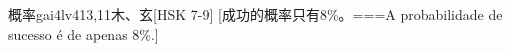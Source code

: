 \begin{EntryWithPhonetic}{概率}{gai4lv4}{13,11}{⽊、⽞}[HSK 7-9]
  [成功的概率只有8\%。===A probabilidade de sucesso é de apenas 8\%.]
\end{EntryWithPhonetic}
